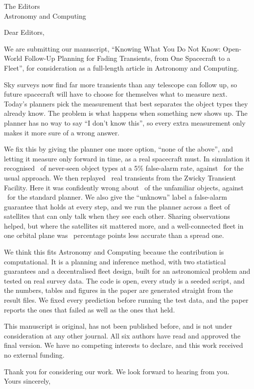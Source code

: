 \documentclass[11pt]{letter}
\begin{document}
\begin{letter}{The Editors\\ Astronomy and Computing}
\opening{Dear Editors,}

We are submitting our manuscript, ``Knowing What You Do Not Know: Open-World Follow-Up Planning for Fading Transients, from One Spacecraft to a Fleet'', for consideration as a full-length article in Astronomy and Computing.

Sky surveys now find far more transients than any telescope can follow up, so future spacecraft will have to choose for themselves what to measure next. Today's planners pick the measurement that best separates the object types they already know. The problem is what happens when something new shows up. The planner has no way to say ``I don't know this'', so every extra measurement only makes it more sure of a wrong answer.

We fix this by giving the planner one more option, ``none of the above'', and letting it measure only forward in time, as a real spacecraft must. In simulation it recognised \SimTprP\ of never-seen object types at a 5\% false-alarm rate, against \SimTprBthree\ for the usual approach. We then replayed \RealNEvents\ real transients from the Zwicky Transient Facility. Here it was confidently wrong about \RealCCwWhP\ of the unfamiliar objects, against \RealCCwWhBthree\ for the standard planner. We also give the ``unknown'' label a false-alarm guarantee that holds at every step, and we run the planner across a fleet of satellites that can only talk when they see each other. Sharing observations helped, but where the satellites sit mattered more, and a well-connected fleet in one orbital plane was \FleetBFourMag\ percentage points less accurate than a spread one.

We think this fits Astronomy and Computing because the contribution is computational. It is a planning and inference method, with two statistical guarantees and a decentralised fleet design, built for an astronomical problem and tested on real survey data. The code is open, every study is a seeded script, and the numbers, tables and figures in the paper are generated straight from the result files. We fixed every prediction before running the test data, and the paper reports the ones that failed as well as the ones that held.

This manuscript is original, has not been published before, and is not under consideration at any other journal. All six authors have read and approved the final version. We have no competing interests to declare, and this work received no external funding.

\closing{Thank you for considering our work. We look forward to hearing from you.\\[1ex] Yours sincerely,}
\end{letter}
\end{document}
